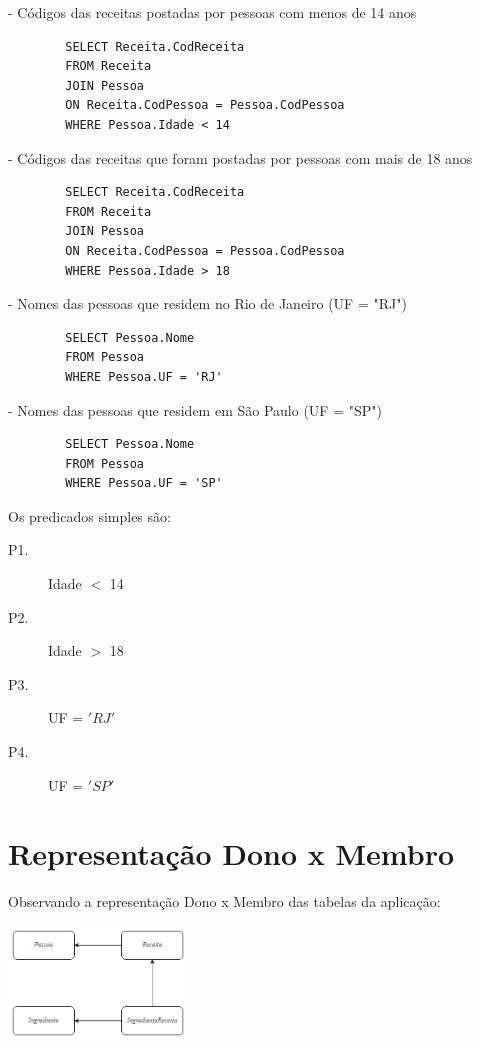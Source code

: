 \documentclass[12pt,a4paper]{article}
\begin{document}
\begin{description}
	\item - Códigos das receitas postadas por pessoas com menos de 14 anos
	\begin{verbatim}
		SELECT Receita.CodReceita
		FROM Receita
		JOIN Pessoa
		ON Receita.CodPessoa = Pessoa.CodPessoa
		WHERE Pessoa.Idade < 14
	\end{verbatim}
	
	\item - Códigos das receitas que foram postadas por pessoas com mais de 18 anos
	\begin{verbatim}
		SELECT Receita.CodReceita
		FROM Receita
		JOIN Pessoa
		ON Receita.CodPessoa = Pessoa.CodPessoa
		WHERE Pessoa.Idade > 18
	\end{verbatim}
	
	\item - Nomes das pessoas que residem no Rio de Janeiro (UF = "RJ")
	\begin{verbatim}
		SELECT Pessoa.Nome
		FROM Pessoa
		WHERE Pessoa.UF = 'RJ'
	\end{verbatim}
	
	\item - Nomes das pessoas que residem em São Paulo (UF = "SP")
	\begin{verbatim}
		SELECT Pessoa.Nome
		FROM Pessoa
		WHERE Pessoa.UF = 'SP'
	\end{verbatim}
\end{description}

\noindent
Os predicados simples são:
\begin{description}
	\item[P1.] Idade $<$ 14
	\item[P2.] Idade $>$ 18
	\item[P3.] UF = $'RJ'$
	\item[P4.] UF = $'SP'$
\end{description}
	
\newpage
\section{Representação Dono x Membro}

Observando a representação Dono x Membro das tabelas da aplicação:

\begin{center}
	\includegraphics[width=180px]{diagrama.jpg}
\end{center}
\end{document}
